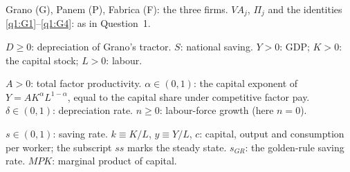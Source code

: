 \begin{sol}
\begin{notacao}
\item Grano (G), Panem (P), Fabrica (F): the three firms. $VA_j$, $\Pi_j$ and the identities \eqref{q1:G1}--\eqref{q1:G4}: as in Question~1.
\item $D\ge0$: depreciation of Grano's tractor. $S$: national saving. $Y>0$: GDP; $K>0$: the capital stock; $L>0$: labour.
\item $A>0$: total factor productivity. $\alpha\in(0,1)$: the capital exponent of $Y=AK^{\alpha}L^{1-\alpha}$, equal to the capital
share under competitive factor pay. $\delta\in(0,1)$: depreciation rate. $n\ge0$: labour-force growth (here $n=0$).
\item $s\in(0,1)$: saving rate. $k\equiv K/L$, $y\equiv Y/L$, $c$: capital, output and consumption per worker; the subscript $ss$
marks the steady state. $s_{GR}$: the golden-rule saving rate. $MPK$: marginal product of capital.
\end{notacao}


\end{sol}
